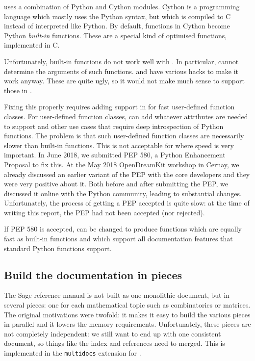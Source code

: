 \documentclass{deliverablereport}
\begin{document}
\Sage uses a combination of Python and Cython modules.
Cython is a programming language which mostly uses the Python syntax,
but which is compiled to C instead of interpreted like Python.
By default, functions in Cython become Python \emph{built-in} functions.
These are a special kind of optimised functions, implemented in C.

Unfortunately, built-in functions do not work well with \Sphinx.
In particular, \Sphinx cannot determine the arguments of such functions.
\Sage and \Cython have various hacks to make it work anyway.
These are quite ugly, so it would not make much sense to support those in \Sphinx.

Fixing this properly requires adding support in \Python
for fast user-defined function classes.
For user-defined function classes, \Cython can add whatever attributes
are needed to support \Sphinx and other use cases that require deep introspection
of Python functions.
The problem is that such user-defined function classes
are necessarily slower than built-in functions.
This is not acceptable for \Sage where speed is very important.
In June 2018, we submitted PEP 580, a Python Enhancement Proposal to fix this.
At the May 2018 OpenDreamKit workshop in Cernay,
we already discussed an earlier variant of the PEP
with the core \Cython developers and they were very positive about it.
Both before and after submitting the PEP,
we discussed it online with the Python community,
leading to substantial changes.
Unfortunately, the process of getting a PEP accepted is quite slow:
at the time of writing this report, the PEP had not been accepted (nor rejected).

If PEP 580 is accepted, \Cython can be changed to produce
functions which are equally fast as built-in functions
and which support all documentation
features that standard Python functions support.

\subsection{Build the documentation in pieces}

The Sage reference manual is not built as one monolithic document,
but in several pieces:
one for each mathematical topic such as combinatorics or matrices.
The original motivations were twofold: it makes it easy to build the various pieces
in parallel and it lowers the memory requirements.
Unfortunately, these pieces are not completely independent:
we still want to end up with one consistent document,
so things like the index and references need to merged.
This is implemented in the \Sage \texttt{multidocs} extension for \Sphinx.
\end{document}
